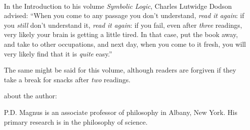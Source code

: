 \thispagestyle{empty}
\onecolumn
\ 
\vfill

\parbox{3 in}{
In the Introduction to his volume \emph{Symbolic Logic}, Charles Lutwidge Dodson advised: ``When you come to any passage you don't understand, \emph{read it again}: if you \emph{still} don't understand it, \emph{read it again}: if you fail, even after \emph{three} readings, very likely your brain is getting a little tired. In that case, put the book away, and take to other occupations, and next day, when you come to it fresh, you will very likely find that it is \emph{quite} easy.''

\medskip

The same might be said for this volume, although readers are forgiven if they take a break for snacks after \emph{two} readings.
}

\vfill

\parbox{3 in}{
{\sf about the author:}
\medskip

P.D. Magnus is an associate professor of philosophy in Albany, New York. His primary research is in the philosophy of science.
}
\vfill
